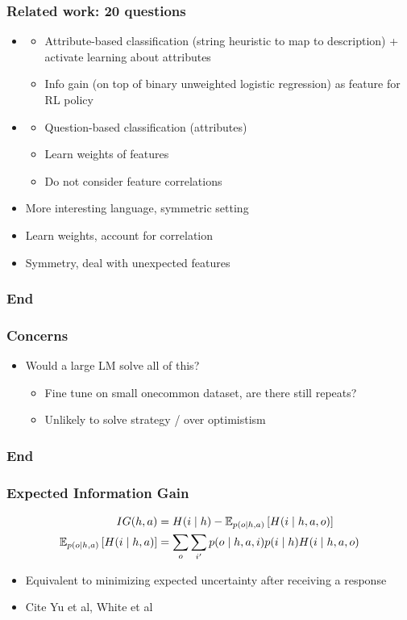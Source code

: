 \documentclass{beamer}
\begin{document}
\begin{frame}
\frametitle{Related work: 20 questions}
\begin{itemize}
\item \citet{padmakumar}
    \begin{itemize}
    \item Attribute-based classification (string heuristic to map to description)
        + activate learning about attributes
    \item Info gain (on top of binary unweighted logistic regression) as feature for
        RL policy
    \end{itemize}
\item \citet{yu}
    \begin{itemize}
    \item Question-based classification (attributes)
    \item Learn weights of features
    \item Do not consider feature correlations
    \end{itemize}
\item More interesting language, symmetric setting
\item Learn weights, account for correlation
\item Symmetry, deal with unexpected features
\end{itemize}
\end{frame}

\begin{frame}
\frametitle{End}
\end{frame}


\begin{frame}
\frametitle{Concerns}
\begin{itemize}
\item Would a large LM solve all of this?
    \begin{itemize}
    \item Fine tune on small onecommon dataset, are there still repeats?
    \item Unlikely to solve strategy / over optimistism
    \end{itemize}
\end{itemize}
\end{frame}

\begin{frame}
\frametitle{End}
\end{frame}


\begin{frame}
\frametitle{Expected Information Gain}
\begin{align*}
IG(h, a) &= H(i \mid h) - \mathbb{E}_{p(o\mid h,a)}\left[H(i \mid h, a, o)\right]\\
\mathbb{E}_{p(o\mid h,a)}\left[H(i \mid h, a)\right] &= \sum_o\sum_{i'}p(o\mid h,a,i)p(i\mid h)H(i \mid h,a,o)
\end{align*}
\begin{itemize}
\item Equivalent to minimizing expected uncertainty after receiving a response
\item Cite Yu et al, White et al
\end{itemize}
\end{frame}
\end{document}
